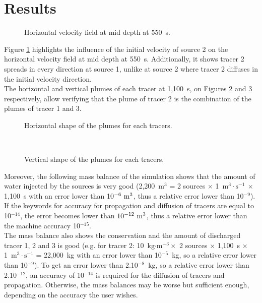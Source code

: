\section{Results}
%
\begin{figure}[!htbp]
\centering
{}
 \caption{Horizontal velocity field at mid depth at 550~s.}
 \label{t3d:source:velo}
\end{figure}

\bigskip
Figure \ref{t3d:source:velo} highlights the influence of the initial velocity of
source 2 on the horizontal velocity field at mid depth at 550~s.
Additionally, it shows tracer 2 spreads in every direction
at source 1, unlike at source 2 where tracer 2 diffuses in the initial
velocity direction.\\
The horizontal and vertical plumes of each tracer at 1,100~s, on
Figures \ref{t3d:source:hor_shape} and \ref{t3d:source:ver_shape}
respectively, allow verifying that the plume of tracer 2 is the
combination of the plumes of tracer 1 and 3.

\begin{figure}[!htbp]
\centering
{}
 \caption{Horizontal shape of the plumes for each tracers.}
 \label{t3d:source:hor_shape}
\end{figure}
%
\begin{figure}[!htbp]
\centering
{}\\
 \caption{Vertical shape of the plumes for each tracers.}
 \label{t3d:source:ver_shape}
\end{figure}
\bigskip
Moreover, the following mass balance of the  simulation
shows that the amount of water injected by the sources is very good
(2,200~m$^3$ = 2 sources $\times$ 1~m$^3\cdot\text{s}^{-1}~\times$ 1,100~s
with an error lower than 10$^{-6}~\rm{m}^3$, thus a relative error
lower than 10$^{-9}$). If the keywords for accuracy for propagation and diffusion of tracers
are equal to 10$^{-14}$, the error becomes lower than
$10^{-12}~\rm{m}^3$, thus a relative error lower than the machine
accuracy 10$^{-15}$.\\
The mass balance also shows the conservation and the amount of
discharged tracer 1, 2 and 3 is good
(e.g. for tracer 2: 10~kg$\cdot\text{m}^{-3} \times$ 2 sources $\times$ 1,100~s
$\times$ 1~m$^3\cdot\text{s}^{-1}$ = 22,000~kg with an error lower than 10$^{-5}$~kg,
so a relative error lower than 10$^{-9}$).
To get an error lower than 2.10$^{-8}$~kg, so a relative error lower
than 2.10$^{-12}$, an accuracy of 10$^{-14}$ is required for the
diffusion of tracers and propagation.
Otherwise, the mass balances may be worse but sufficient enough,
depending on the accuracy the user wishes.


